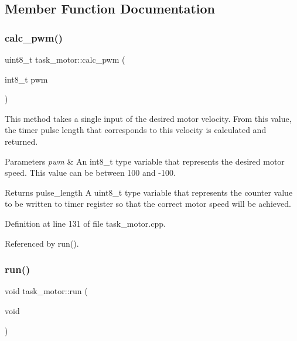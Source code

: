 \subsection{Member Function Documentation}
\mbox{\label{classtask__motor_a6022366bdc25c0a1c16b96bbc02bcffa}} 
\subsubsection{\texorpdfstring{calc\+\_\+pwm()}{calc\_pwm()}}
{\footnotesize\ttfamily uint8\+\_\+t task\+\_\+motor\+::calc\+\_\+pwm (\begin{DoxyParamCaption}\item[{int8\+\_\+t}]{pwm }\end{DoxyParamCaption})\hspace{0.3cm}{\ttfamily [protected]}}

This method takes a single input of the desired motor velocity. From this value, the timer pulse length that corresponds to this velocity is calculated and returned. 
\begin{DoxyParams}{Parameters}
{\em pwm} & An int8\+\_\+t type variable that represents the desired motor speed. This value can be between 100 and -\/100. \\
\hline
\end{DoxyParams}
\begin{DoxyReturn}{Returns}
pulse\+\_\+length A uint8\+\_\+t type variable that represents the counter value to be written to timer register so that the correct motor speed will be achieved. 
\end{DoxyReturn}


Definition at line 131 of file task\+\_\+motor.\+cpp.



Referenced by run().

\mbox{\label{classtask__motor_a895a075ec470c9d5a07b8959de06aacd}} 
\subsubsection{\texorpdfstring{run()}{run()}}
{\footnotesize\ttfamily void task\+\_\+motor\+::run (\begin{DoxyParamCaption}\item[{void}]{ }\end{DoxyParamCaption})}

